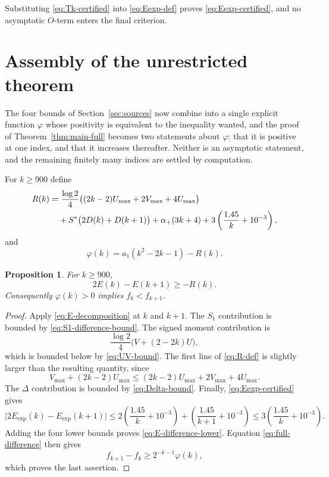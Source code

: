 \documentclass[11pt]{amsart}
\theoremstyle{plain}
\newtheorem{proposition}[theorem]{Proposition}
\theoremstyle{definition}
\newcommand{\abs}[1]{\lvert #1\rvert}
\begin{document}
Substituting \eqref{eq:Tk-certified} into \eqref{eq:Eexp-def} proves
\eqref{eq:Eexp-certified}, and no asymptotic $O$-term enters the final
criterion.

\section{Assembly of the unrestricted theorem}\label{sec:assembly}

The four bounds of Section~\ref{sec:sources} now combine into a single
explicit function $\varphi$ whose positivity is equivalent to the inequality
wanted, and the proof of Theorem~\ref{thm:main-full} becomes two statements
about $\varphi$: that it is positive at one index, and that it increases
thereafter. Neither is an asymptotic statement, and the remaining finitely
many indices are settled by computation.

For $k\geq900$ define
\begin{align}
 R(k)=&\ \frac{\log2}{4}
 \bigl((2k-2)U_{\max}+2V_{\max}+4U_{\max}\bigr)\notag\\
 &+S^*\bigl(2D(k)+D(k+1)\bigr)
   +\alpha_+(3k+4)
   +3\left(\frac{1.45}{k}+10^{-3}\right),
 \label{eq:R-def}
\end{align}
and
\begin{equation}\label{eq:phi-def}
 \varphi(k)=a_1(k^2-2k-1)-R(k).
\end{equation}

\begin{proposition}\label{prop:criterion-phi}
For $k\geq900$,
\begin{equation}\label{eq:E-difference-lower}
 2E(k)-E(k+1)\geq-R(k).
\end{equation}
Consequently $\varphi(k)>0$ implies $f_k<f_{k+1}$.
\end{proposition}

\begin{proof}
Apply \eqref{eq:E-decomposition} at $k$ and $k+1$. The $S_1$ contribution is
bounded by \eqref{eq:S1-difference-bound}. The signed moment contribution is
\[
 \frac{\log2}{4}\bigl(V+(2-2k)U\bigr),
\]
which is bounded below by \eqref{eq:UV-bound}. The first line of
\eqref{eq:R-def} is slightly larger than the resulting quantity, since
\[
 V_{\max}+(2k-2)U_{\max}
 \leq(2k-2)U_{\max}+2V_{\max}+4U_{\max}.
\]
The $\Delta$ contribution is bounded by \eqref{eq:Delta-bound}. Finally,
\eqref{eq:Eexp-certified} gives
\[
 \abs{2E_{\exp}(k)-E_{\exp}(k+1)}
 \leq2\left(\frac{1.45}{k}+10^{-3}\right)
     +\left(\frac{1.45}{k+1}+10^{-3}\right)
 \leq3\left(\frac{1.45}{k}+10^{-3}\right).
\]
Adding the four lower bounds proves \eqref{eq:E-difference-lower}. Equation
\eqref{eq:full-difference} then gives
\[
 f_{k+1}-f_k\geq2^{-k-1}\varphi(k),
\]
which proves the last assertion.
\end{proof}
\end{document}
